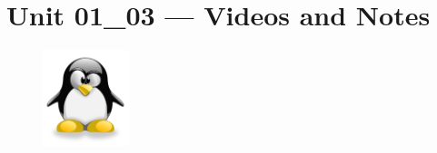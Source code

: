 \documentclass[letterpaper,12pt]{exam}
\begin{document}
\section*{Unit 01\_03 --- Videos and Notes} %

\begin{questions}
\question  
\vspace{1.5cm}
\end{questions}


\begin{figure}[b]\label{end}
	\center
	\includegraphics[width=1in]{tux}
	{}
\end{figure}
\end{document}
